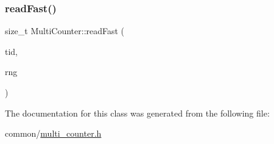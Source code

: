 \mbox{\label{classMultiCounter_a70fb0fd4c01d29e880421eb9aed27757}} 
\subsubsection{\texorpdfstring{read\+Fast()}{readFast()}}
{\footnotesize\ttfamily size\+\_\+t Multi\+Counter\+::read\+Fast (\begin{DoxyParamCaption}\item[{const int}]{tid,  }\item[{\hyperlink{classRandomFNV1A}{Random\+F\+N\+V1A} $\ast$}]{rng }\end{DoxyParamCaption})\hspace{0.3cm}{\ttfamily [inline]}}



The documentation for this class was generated from the following file\+:\begin{DoxyCompactItemize}
\item 
common/\hyperlink{multi__counter_8h}{multi\+\_\+counter.\+h}\end{DoxyCompactItemize}
